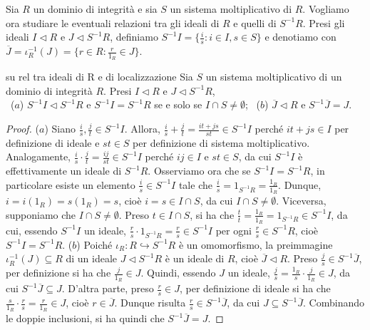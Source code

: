 \noindent Sia $R$ un dominio di integrità e sia $S$ un sistema moltiplicativo di $R$. Vogliamo ora studiare le eventuali relazioni tra gli ideali di $R$ e quelli di $S^{-1}R$. Presi gli ideali $I\lhd R$ e $J\lhd S^{-1}R$, definiamo $S^{-1}I=\{\frac{i}{s}: i\in I, s\in S\}$ e denotiamo con $\overline{J}=\iota_R^{-1}(J)=\{r\in R: \frac{r}{1_R}\in J\}$.

\begin{prop}[1.7.6]{su rel tra ideali di R e di localizzazione}
  Sia $S$ un sistema moltiplicativo di un dominio di integrità $R$. Presi $I\lhd R$ e $J\lhd S^{-1}R$,\\
  \ ($a$) $S^{-1}I\lhd S^{-1}R$ e $S^{-1}I=S^{-1}R$ se e solo se $I\cap S\neq \emptyset$;
  \ ($b$) $\overline{J}\lhd R$ e $S^{-1}\overline{J}=J$.
\end{prop}
\vspace{-4mm}
\begin{proof}
  ($a$) Siano $\frac{i}{s},\frac{j}{t}\in S^{-1}I$. Allora, $\frac{i}{s}+\frac{j}{t}=\frac{it+js}{st}\in S^{-1}I$ perché $it+js\in I$ 
  per definizione di ideale e $st\in S$ per definizione di sistema moltiplicativo. Analogamente, $\frac{i}{s}\cdot \frac{j}{t}=\frac{ij}{st}\in S^{-1}I$ 
  perché $ij\in I$ e $st\in S$, da cui $S^{-1}I$ è effettivamente un ideale di $S^{-1}R$. 
  Osserviamo ora che se $S^{-1}I=S^{-1}R$, in particolare esiste un elemento $\frac{i}{s}\in S^{-1}I$ tale che $\frac{i}{s}=1_{S^{-1}R}=\frac{1_R}{1_R}$. 
  Dunque, $i=i(1_R)=s(1_R)=s$, cioè $i=s\in I\cap S$, da cui $I\cap S\neq \emptyset$. 
  Viceversa, supponiamo che $I\cap S\neq \emptyset$. Preso $t\in I\cap S$, si ha che $\frac{t}{t}=\frac{1_R}{1_R}=1_{S^{-1}R}\in S^{-1}I$, da cui, 
  essendo $S^{-1}I$ un ideale, $\frac{r}{s}\cdot 1_{S^{-1}R}=\frac{r}{s}\in S^{-1}I$ per ogni $\frac{r}{s}\in S^{-1}R$, cioè $S^{-1}I=S^{-1}R$.
  \vspace{1mm}
  \noindent ($b$) Poiché $\iota_R\colon R\hookrightarrow S^{-1}R$ è un omomorfismo, la preimmagine $\iota_R^{-1}(J)\subseteq R$ di un ideale 
  $J\lhd S^{-1}R$ è un ideale di $R$, cioè $\overline{J}\lhd R$. Preso $\frac{j}{s}\in S^{-1}\overline{J}$, 
  per definizione si ha che $\frac{j}{1_R}\in J$. Quindi, essendo $J$ un ideale, $\frac{j}{s}=\frac{1_R}{s}\cdot \frac{j}{1_R}\in J$, 
  da cui $S^{-1}\overline{J}\subseteq J$. D'altra parte, preso $\frac{r}{s}\in J$, per definizione di ideale si ha che 
  $\frac{s}{1_R}\cdot \frac{r}{s}=\frac{r}{1_R}\in J$, cioè $r\in \overline{J}$. Dunque risulta $\frac{r}{s}\in S^{-1}\overline{J}$, 
  da cui $J\subseteq S^{-1}\overline{J}$. Combinando le doppie inclusioni, si ha quindi che $S^{-1}\overline{J}=J$.
\end{proof}

